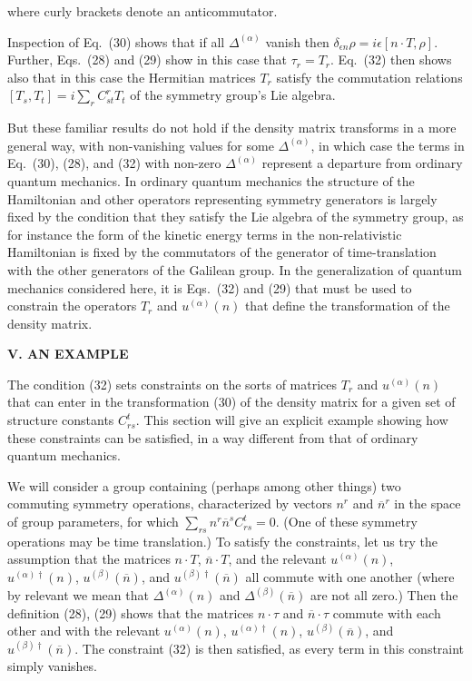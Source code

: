 \documentclass[12pt]{article}
\begin{document}
where curly brackets denote an anticommutator.


Inspection of Eq.~(30) shows that if all $\Delta^{(\alpha)}$ vanish then $\delta_{\epsilon n}\rho=i\epsilon[n\cdot T, \rho]$.  Further, Eqs.~(28) and (29) show in this case that  $\tau_r=T_r$.   Eq.~(32) then shows also that in this case the Hermitian matrices $T_r$  satisfy the commutation relations $[T_s,T_t]=i\sum_r C^r_{st}T_t$ of the symmetry group's Lie algebra.  

But these familiar results do not hold if the density matrix transforms in a more general way, with non-vanishing values for some $\Delta^{(\alpha)}$, in which case the terms in Eq.~(30), (28), and (32) with non-zero $\Delta^{(\alpha)}$  represent a departure from ordinary quantum mechanics.  In ordinary quantum mechanics the structure of the Hamiltonian and other operators representing symmetry generators is largely fixed by the condition that they satisfy the Lie algebra of the symmetry group, as for instance the  form of the kinetic energy terms in the non-relativistic Hamiltonian is fixed by the commutators of the generator of time-translation with the other generators of the Galilean group.  In the generalization of quantum mechanics considered here, it is Eqs.~(32) and (29) that must be used to constrain the operators $T_r$ and  $u^{(\alpha)}(n)$ that define the transformation of the density matrix.   


\vspace{20pt}

\begin{center}
{\bf V. AN EXAMPLE}
\end{center}


The condition (32)  sets constraints on the sorts of matrices $T_r$ and $u^{(\alpha)}(n)$ that can enter in the transformation (30) of the density matrix for a given set of structure constants $C^t_{rs}$.  This section will  give an explicit example showing how these constraints can be satisfied, in a way different from that of ordinary quantum mechanics.  

We will consider a group containing (perhaps among other things) two commuting symmetry operations, characterized by vectors $n^r$ and $\overline{n}^r$ in the space of group parameters, for which $\sum_{rs}n^r\overline{n}^sC_{rs}^t=0$.  (One of these symmetry operations may be time translation.)  To satisfy the constraints, let us try the assumption that the matrices $n\cdot T$, $\overline{n}\cdot T$, and the relevant $u^{(\alpha)}(n)$, $u^{(\alpha)\dagger}(n)$, $u^{(\beta)}(\overline{n})$, and $u^{(\beta)\dagger}(\overline{n})$ all commute with one another (where by relevant we mean that $\Delta^{(\alpha)}(n)$ and $\Delta^{(\beta)}(\overline{n})$ are not all zero.)     Then the definition (28), (29) shows that the matrices $n\cdot \tau$ and $\overline{n}\cdot \tau$ commute with each other and with the relevant $u^{(\alpha)}(n)$, $u^{(\alpha)\dagger}(n)$, $u^{(\beta)}(\overline{n})$, and $u^{(\beta)\dagger}(\overline{n})$.    The constraint (32) is then satisfied, as every term in this constraint simply vanishes.
\end{document}
